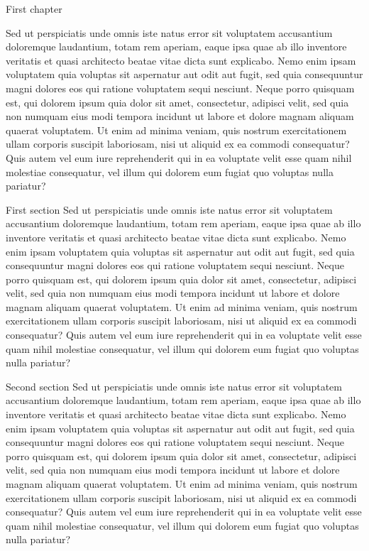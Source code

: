 \documentclass[french, english]{mythesis}
\begin{document}
	\begin{mychapter}{First chapter}

	Sed ut perspiciatis unde omnis iste natus error sit voluptatem accusantium doloremque laudantium, totam rem aperiam, eaque ipsa quae ab illo inventore veritatis et quasi architecto beatae vitae dicta sunt explicabo. Nemo enim ipsam voluptatem quia voluptas sit aspernatur aut odit aut fugit, sed quia consequuntur magni dolores eos qui ratione voluptatem sequi nesciunt. Neque porro quisquam est, qui dolorem ipsum quia dolor sit amet, consectetur, adipisci velit, sed quia non numquam eius modi tempora incidunt ut labore et dolore magnam aliquam quaerat voluptatem. Ut enim ad minima veniam, quis nostrum exercitationem ullam corporis suscipit laboriosam, nisi ut aliquid ex ea commodi consequatur? Quis autem vel eum iure reprehenderit qui in ea voluptate velit esse quam nihil molestiae consequatur, vel illum qui dolorem eum fugiat quo voluptas nulla pariatur?
	
	\begin{mysection}{First section}
			Sed ut perspiciatis unde omnis iste natus error sit voluptatem accusantium doloremque laudantium, totam rem aperiam, eaque ipsa quae ab illo inventore veritatis et quasi architecto beatae vitae dicta sunt explicabo. Nemo enim ipsam voluptatem quia voluptas sit aspernatur aut odit aut fugit, sed quia consequuntur magni dolores eos qui ratione voluptatem sequi nesciunt. Neque porro quisquam est, qui dolorem ipsum quia dolor sit amet, consectetur, adipisci velit, sed quia non numquam eius modi tempora incidunt ut labore et dolore magnam aliquam quaerat voluptatem. Ut enim ad minima veniam, quis nostrum exercitationem ullam corporis suscipit laboriosam, nisi ut aliquid ex ea commodi consequatur? Quis autem vel eum iure reprehenderit qui in ea voluptate velit esse quam nihil molestiae consequatur, vel illum qui dolorem eum fugiat quo voluptas nulla pariatur?
	\end{mysection}
	
	\begin{mysection}{Second section}
	Sed ut perspiciatis unde omnis iste natus error sit voluptatem accusantium doloremque laudantium, totam rem aperiam, eaque ipsa quae ab illo inventore veritatis et quasi architecto beatae vitae dicta sunt explicabo. Nemo enim ipsam voluptatem quia voluptas sit aspernatur aut odit aut fugit, sed quia consequuntur magni dolores eos qui ratione voluptatem sequi nesciunt. Neque porro quisquam est, qui dolorem ipsum quia dolor sit amet, consectetur, adipisci velit, sed quia non numquam eius modi tempora incidunt ut labore et dolore magnam aliquam quaerat voluptatem. Ut enim ad minima veniam, quis nostrum exercitationem ullam corporis suscipit laboriosam, nisi ut aliquid ex ea commodi consequatur? Quis autem vel eum iure reprehenderit qui in ea voluptate velit esse quam nihil molestiae consequatur, vel illum qui dolorem eum fugiat quo voluptas nulla pariatur?
	\end{mysection}	
	


\end{mychapter}
\end{document}
